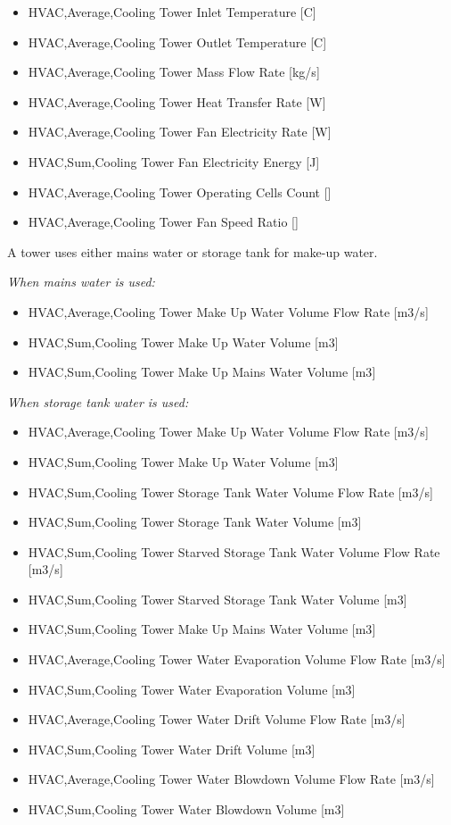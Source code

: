 \begin{itemize}
\item
  HVAC,Average,Cooling Tower Inlet Temperature {[}C{]}
\item
  HVAC,Average,Cooling Tower Outlet Temperature {[}C{]}
\item
  HVAC,Average,Cooling Tower Mass Flow Rate {[}kg/s{]}
\item
  HVAC,Average,Cooling Tower Heat Transfer Rate {[}W{]}
\item
  HVAC,Average,Cooling Tower Fan Electricity Rate {[}W{]}
\item
  HVAC,Sum,Cooling Tower Fan Electricity Energy {[}J{]}
\item
  HVAC,Average,Cooling Tower Operating Cells Count {[]}
\item
  HVAC,Average,Cooling Tower Fan Speed Ratio {[]}
\end{itemize}

A tower uses either mains water or storage tank for make-up water.

\emph{When mains water is used:}

\begin{itemize}
\item
  HVAC,Average,Cooling Tower Make Up Water Volume Flow Rate {[}m3/s{]}
\item
  HVAC,Sum,Cooling Tower Make Up Water Volume {[}m3{]}
\item
  HVAC,Sum,Cooling Tower Make Up Mains Water Volume {[}m3{]}
\end{itemize}

\emph{When storage tank water is used:}

\begin{itemize}
\item
  HVAC,Average,Cooling Tower Make Up Water Volume Flow Rate {[}m3/s{]}
\item
  HVAC,Sum,Cooling Tower Make Up Water Volume {[}m3{]}
\item
  HVAC,Sum,Cooling Tower Storage Tank Water Volume Flow Rate {[}m3/s{]}
\item
  HVAC,Sum,Cooling Tower Storage Tank Water Volume {[}m3{]}
\item
  HVAC,Sum,Cooling Tower Starved Storage Tank Water Volume Flow Rate {[}m3/s{]}
\item
  HVAC,Sum,Cooling Tower Starved Storage Tank Water Volume {[}m3{]}
\item
  HVAC,Sum,Cooling Tower Make Up Mains Water Volume {[}m3{]}
\item
  HVAC,Average,Cooling Tower Water Evaporation Volume Flow Rate {[}m3/s{]}
\item
  HVAC,Sum,Cooling Tower Water Evaporation Volume {[}m3{]}
\item
  HVAC,Average,Cooling Tower Water Drift Volume Flow Rate {[}m3/s{]}
\item
  HVAC,Sum,Cooling Tower Water Drift Volume {[}m3{]}
\item
  HVAC,Average,Cooling Tower Water Blowdown Volume Flow Rate {[}m3/s{]}
\item
  HVAC,Sum,Cooling Tower Water Blowdown Volume {[}m3{]}
\end{itemize}

